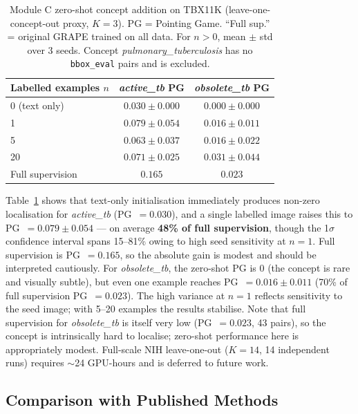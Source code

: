 \documentclass{article}
\begin{document}
\begin{table}[t]
  \caption{Module C zero-shot concept addition on TBX11K (leave-one-concept-out proxy, $K=3$). PG = Pointing Game. ``Full sup.'' = original GRAPE trained on all data. For $n>0$, mean $\pm$ std over 3 seeds. Concept \textit{pulmonary\_tuberculosis} has no \texttt{bbox\_eval} pairs and is excluded.}
  \label{tab:zeroshot}
  \centering
  \begin{tabular}{lcc}
    \toprule
    Labelled examples $n$ & \textit{active\_tb} PG & \textit{obsolete\_tb} PG \\
    \midrule
    0 (text only)   & $0.030 \pm 0.000$ & $0.000 \pm 0.000$ \\
    1               & $0.079 \pm 0.054$ & $0.016 \pm 0.011$ \\
    5               & $0.063 \pm 0.037$ & $0.016 \pm 0.022$ \\
    20              & $0.071 \pm 0.025$ & $0.031 \pm 0.044$ \\
    \midrule
    Full supervision & $0.165$ & $0.023$ \\
    \bottomrule
  \end{tabular}
\end{table}

Table~\ref{tab:zeroshot} shows that text-only initialisation immediately produces non-zero localisation for \textit{active\_tb} (PG~$=0.030$), and a single labelled image raises this to PG~$=0.079 \pm 0.054$ — on average \textbf{48\% of full supervision}, though the 1$\sigma$ confidence interval spans 15--81\% owing to high seed sensitivity at $n=1$.
Full supervision is PG~$=0.165$, so the absolute gain is modest and should be interpreted cautiously.
For \textit{obsolete\_tb}, the zero-shot PG is 0 (the concept is rare and visually subtle), but even one example reaches PG~$=0.016 \pm 0.011$ (70\% of full supervision PG~$=0.023$).
The high variance at $n=1$ reflects sensitivity to the seed image; with 5--20 examples the results stabilise.
Note that full supervision for \textit{obsolete\_tb} is itself very low (PG~$=0.023$, 43 pairs), so the concept is intrinsically hard to localise; zero-shot performance here is appropriately modest.
Full-scale NIH leave-one-out ($K=14$, 14 independent runs) requires $\sim$24 GPU-hours and is deferred to future work.

\subsection{Comparison with Published Methods}
\label{sec:sota}
\end{document}
